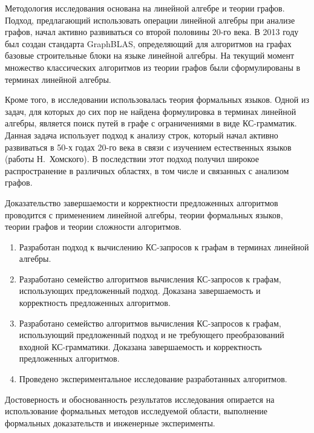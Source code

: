 {\methods} Методология исследования основана на линейной алгебре и теории графов. Подход, предлагающий использовать операции линейной алгебры при анализе графов, начал активно развиваться со второй половины 20-го века. В 2013 году был создан стандарта GraphBLAS, определяющий для алгоритмов на графах базовые строительные блоки на языке линейной алгебры. На текущий момент множество классических алгоритмов из теории графов были сформулированы в терминах линейной алгебры.

Кроме того, в исследовании использовалась теория формальных языков. Одной из задач, для которых до сих пор не найдена формулировка в терминах линейной алгебры, является поиск путей в графе с ограничениями в виде КС-грамматик. Данная задача использует подход к анализу строк, который начал активно развиваться в 50-х годах 20-го века в связи с изучением естественных языков (работы Н.~Хомского). В последствии этот подход получил широкое распространение в различных областях, в том числе и связанных с анализом графов.

Доказательство завершаемости и корректности предложенных алгоритмов проводится с применением линейной алгебры, теории формальных языков, теории графов и теории сложности алгоритмов.

{}
\begin{enumerate}[beginpenalty=10000] %
	\item Разработан подход к вычислению КС-запросов к графам в терминах линейной алгебры.
	\item Разработано семейство алгоритмов вычисления КС-запросов к графам, использующих предложенный подход. Доказана завершаемость и корректность предложенных алгоритмов.
	\item Разработано семейство алгоритмов вычисления КС-запросов к графам, использующий предложенный подход и не требующего преобразований входной КС-грамматики. Доказана завершаемость и корректность предложенных алгоритмов.
	\item Проведено экспериментальное исследование разработанных алгоритмов.
\end{enumerate}

{\reliability} 
Достоверность и обоснованность результатов исследования опирается на использование формальных методов исследуемой области, выполнение формальных доказательств и инженерные эксперименты.

